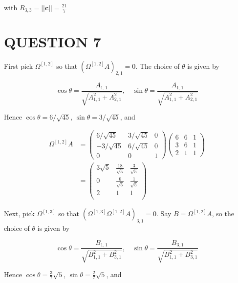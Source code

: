 \documentclass[a4paper]{article}
\begin{document}
with $ R_{3,3} = | | \mathbf{c} | | = \frac{21}{7} $







\section{QUESTION 7}

First pick $ \Omega^{[1,2]} $ so that $ (\Omega^{[1,2]}A)_{2,1} = 0 $. The choice of $ \theta $ is given by

\[ \cos \theta = \frac{A_{1,1}}{\sqrt{A_{1,1}^{2} + A_{2,1}^{2}}}, \quad \sin \theta  = \frac{A_{1,1}}{\sqrt{A_{1,1}^{2} + A_{2,1}^{2}}}  \]

Hence $ \cos \theta = 6 / \sqrt{45} $, $ \sin \theta = 3 / \sqrt{45} $, and

\begin{align*}
\Omega^{[1,2]}A  & =  \begin{pmatrix}
6 / \sqrt{45} & 3 / \sqrt{45} & 0 \\
-3  / \sqrt{45} & 6 / \sqrt{45} & 0 \\
0 & 0 & 1
\end{pmatrix} \begin{pmatrix}
6 & 6 & 1 \\
3 & 6 & 1 \\
2 & 1 & 1
\end{pmatrix}  \\
& = \left(
\begin{array}{ccc}
3 \sqrt{5} & \frac{18}{\sqrt{5}} &
\frac{3}{\sqrt{5}} \\
0 & \frac{6}{\sqrt{5}} &
\frac{1}{\sqrt{5}} \\
2 & 1 & 1 \\
\end{array}
\right)
\end{align*}

Next, pick $ \Omega^{[1,3]} $ so that $ (\Omega^{[1,3]}\Omega^{[1,2]}A)_{3,1} = 0 $. Say $ B = \Omega^{[1,2]} A $, so the choice of $ \theta $ is given by

\[ \cos \theta = \frac{B_{1,1}}{\sqrt{B_{1,1}^{2} + B_{3,1}^{2}}}, \quad \sin \theta  = \frac{B_{3,1}}{\sqrt{B_{1,1}^{2} + B_{3,1}^{2}}}  \]

Hence $ \cos \theta = \frac{3}{7} \sqrt{5} $, $ \sin \theta = \frac{2}{7} \sqrt{5} $, and
\end{document}
